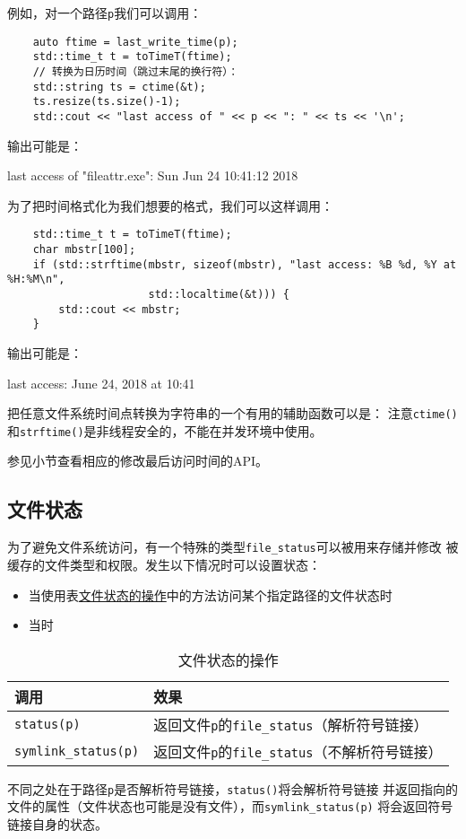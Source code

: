 例如，对一个路径\texttt{p}我们可以调用：
\begin{lstlisting}
    auto ftime = last_write_time(p);
    std::time_t t = toTimeT(ftime);
    // 转换为日历时间（跳过末尾的换行符）：
    std::string ts = ctime(&t);
    ts.resize(ts.size()-1);
    std::cout << "last access of " << p << ": " << ts << '\n';
\end{lstlisting}
输出可能是：
\begin{blacklisting}
    last access of "fileattr.exe": Sun Jun 24 10:41:12 2018
\end{blacklisting}
为了把时间格式化为我们想要的格式，我们可以这样调用：
\begin{lstlisting}
    std::time_t t = toTimeT(ftime);
    char mbstr[100];
    if (std::strftime(mbstr, sizeof(mbstr), "last access: %B %d, %Y at %H:%M\n",
                      std::localtime(&t))) {
        std::cout << mbstr;
    }
\end{lstlisting}
输出可能是：
\begin{blacklisting}
    last access: June 24, 2018 at 10:41
\end{blacklisting}
把任意文件系统时间点转换为字符串的一个有用的辅助函数可以是：
注意\texttt{ctime()}和\texttt{strftime()}是非线程安全的，不能在并发环境中使用。

参见小节查看相应的修改最后访问时间的API。

\subsection{文件状态}\label{ch20.4.2}
为了避免文件系统访问，有一个特殊的类型\texttt{file\_status}可以被用来存储并修改
被缓存的文件类型和权限。发生以下情况时可以设置状态：
\begin{itemize}
    \item 当使用表\hyperref[t20.12]{文件状态的操作}中的方法访问某个指定路径的文件状态时
    \item 当时
\end{itemize}
\begin{table}[htb]
    \centering
    \begin{tabular}{l|l}
        \hline
        \textbf{调用}                 & \textbf{效果}                                   \\
        \hline
        \texttt{status(p)}          & 返回文件\texttt{p}的\texttt{file\_status}（解析符号链接）  \\
        \texttt{symlink\_status(p)} & 返回文件\texttt{p}的\texttt{file\_status}（不解析符号链接） \\
        \hline
    \end{tabular}
    \caption{文件状态的操作}
    \label{t20.12}
\end{table}
不同之处在于路径\texttt{p}是否解析符号链接，\texttt{status()}将会解析符号链接
并返回指向的文件的属性（文件状态也可能是没有文件），而\texttt{symlink\_status(p)}
将会返回符号链接自身的状态。

